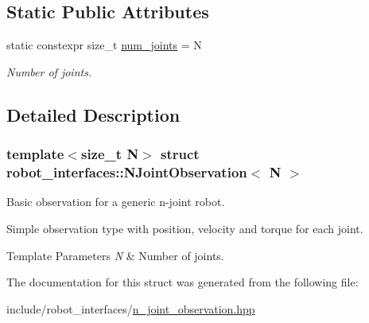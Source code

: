 \subsection*{Static Public Attributes}
\begin{DoxyCompactItemize}
\item 
\mbox{\label{structrobot__interfaces_1_1NJointObservation_ab82f5a0d187661046f76cd5f92701b1c}} 
static constexpr size\+\_\+t \hyperlink{structrobot__interfaces_1_1NJointObservation_ab82f5a0d187661046f76cd5f92701b1c}{num\+\_\+joints} = N
\begin{DoxyCompactList}\small\item\em Number of joints. \end{DoxyCompactList}\end{DoxyCompactItemize}


\subsection{Detailed Description}
\subsubsection*{template$<$size\+\_\+t N$>$\newline
struct robot\+\_\+interfaces\+::\+N\+Joint\+Observation$<$ N $>$}

Basic observation for a generic n-\/joint robot. 

Simple observation type with position, velocity and torque for each joint.


\begin{DoxyTemplParams}{Template Parameters}
{\em N} & Number of joints. \\
\hline
\end{DoxyTemplParams}


The documentation for this struct was generated from the following file\+:\begin{DoxyCompactItemize}
\item 
include/robot\+\_\+interfaces/\hyperlink{n__joint__observation_8hpp}{n\+\_\+joint\+\_\+observation.\+hpp}\end{DoxyCompactItemize}
